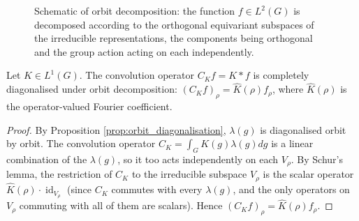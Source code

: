 \begin{figure}[htbp]
\centering
{}
\caption{Schematic of orbit decomposition: the function $f\in L^2(G)$ is decomposed according to the orthogonal equivariant subspaces of the irreducible representations, the components being orthogonal and the group action acting on each independently.}
\label{fig:orbit_decomposition}
\end{figure}

\begin{corollary}\label{cor:convolution_orbit_decomp}
Let $K \in L^1(G)$. The convolution operator $C_K f = K * f$ is completely diagonalised under orbit decomposition: $(C_K f)_\rho = \hat{K}(\rho) f_\rho$, where $\hat{K}(\rho)$ is the operator-valued Fourier coefficient.
\end{corollary}

\begin{proof}
By Proposition \ref{prop:orbit_diagonalisation}, $\lambda(g)$ is diagonalised orbit by orbit. The convolution operator $C_K = \int_G K(g) \lambda(g) dg$ is a linear combination of the $\lambda(g)$, so it too acts independently on each $V_\rho$. By Schur's lemma, the restriction of $C_K$ to the irreducible subspace $V_\rho$ is the scalar operator $\hat{K}(\rho) \cdot \operatorname{id}_{V_\rho}$ (since $C_K$ commutes with every $\lambda(g)$, and the only operators on $V_\rho$ commuting with all of them are scalars). Hence $(C_K f)_\rho = \hat{K}(\rho) f_\rho$.
\end{proof}

